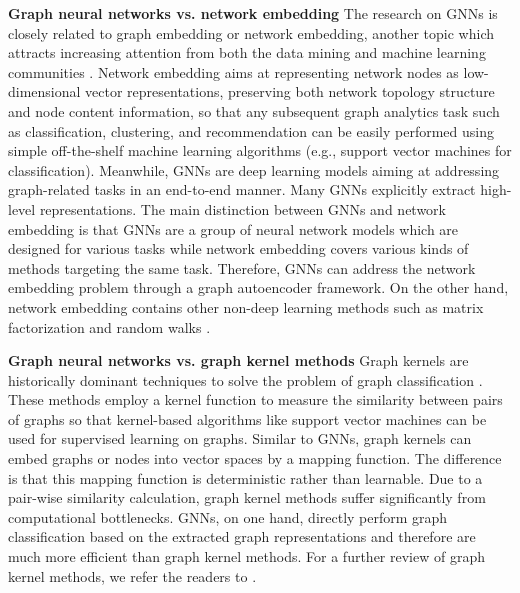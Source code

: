 \vspace{.1cm}
\textbf{Graph neural networks vs. network embedding } 
The research on GNNs is closely related to graph embedding or network embedding, another topic which attracts increasing attention from both the data mining and machine learning communities \cite{hamilton2017representation,cui2017survey,zhang2018network,cai2018comprehensive,goyal2018graph,pan2016tri}.  Network embedding aims at representing network nodes as low-dimensional vector representations, preserving both network topology structure and node content information, so that any subsequent graph analytics task such as classification, clustering, and recommendation  can be easily performed using simple off-the-shelf machine learning algorithms (e.g., support vector machines for classification). 
Meanwhile, GNNs are deep learning models aiming at addressing graph-related tasks in an end-to-end manner. Many GNNs explicitly extract high-level representations. %
The main distinction between GNNs and network embedding is that GNNs are a group of neural network models which are designed for various tasks while network embedding covers various kinds of methods targeting the same task. Therefore, GNNs can address the network embedding problem through a graph autoencoder framework. On the other hand, network embedding contains other non-deep learning methods such as  matrix factorization \cite{IJCAI-18-Shen,ICDM-18-Hong} and random walks \cite{perozzi2014deepwalk}.
	
\vspace{.1cm}
\textbf{Graph neural networks vs. graph kernel methods}
Graph kernels are historically dominant techniques to solve the problem of graph classification \cite{vishwanathan2010graph,shervashidze2011weisfeiler,navarin2017approximated}. These methods employ a kernel function to measure the similarity between pairs of graphs so that kernel-based algorithms like support vector machines can be used for supervised learning on graphs.  Similar to GNNs, graph kernels can embed graphs or nodes into vector spaces by a mapping function. The difference is that this mapping function is deterministic rather than learnable. Due to a pair-wise similarity calculation, graph kernel methods suffer significantly from computational bottlenecks. GNNs, on one hand, directly perform graph classification based on the extracted graph representations and therefore are much more efficient than graph kernel methods. For a further review of graph kernel methods, we refer the readers to \cite{kriege2019survey}.%

